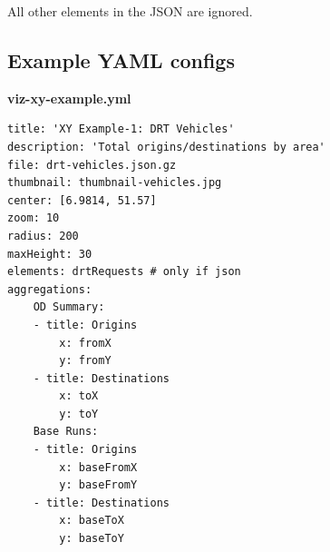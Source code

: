 All other elements in the JSON are ignored.

\hypertarget{example-yaml-configs}{%
\subsection{Example YAML configs}\label{example-yaml-configs}}

\textbf{viz-xy-example.yml}

\begin{lstlisting}
title: 'XY Example-1: DRT Vehicles'
description: 'Total origins/destinations by area'
file: drt-vehicles.json.gz
thumbnail: thumbnail-vehicles.jpg
center: [6.9814, 51.57]
zoom: 10
radius: 200
maxHeight: 30
elements: drtRequests # only if json
aggregations:
    OD Summary:
    - title: Origins
        x: fromX
        y: fromY
    - title: Destinations
        x: toX
        y: toY
    Base Runs:
    - title: Origins
        x: baseFromX
        y: baseFromY
    - title: Destinations
        x: baseToX
        y: baseToY
\end{lstlisting}


